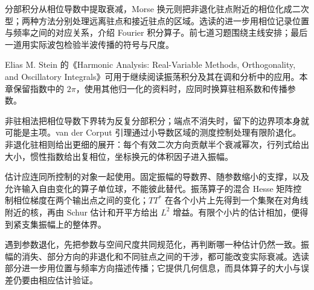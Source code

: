 \ProseParagraphBreak

分部积分从相位导数中提取衰减，Morse 换元则把非退化驻点附近的相位化成二次型；两种方法分别处理远离驻点和接近驻点的区域。选读的进一步用相位记录位置与频率之间的对应关系，介绍 Fourier 积分算子。前七道习题围绕主线安排；最后一道用实际波包检验半波传播的符号与尺度。

\ProseParagraphBreak

Elias M. Stein 的《Harmonic Analysis: Real-Variable Methods, Orthogonality, and Oscillatory Integrals》\cite{Stein1993Harmonic}可用于继续阅读振荡积分及其在调和分析中的应用。本章保留指数中的 \(2\pi\)，使用其他归一化的资料时，应同时换算驻相系数和传播参数。







\begin{chaptersummary}
非驻相法把相位导数下界转为反复分部积分；端点不消失时，留下的边界项本身就可能是主项。van der Corput 引理通过小导数区域的测度控制处理有限阶退化。非退化驻相则给出更细的展开：每个有效二次方向贡献半个衰减幂次，行列式给出大小，惯性指数给出复相位，坐标换元的体积因子进入振幅。

\ProseParagraphBreak

估计应连同所控制的对象一起使用。固定振幅的导数界、随参数缩小的支撑，以及允许输入自由变化的算子单位球，不能彼此替代。振荡算子的混合 Hesse 矩阵控制相位梯度在两个输出点之间的变化；\(TT^*\) 在各个小片上先得到一个集聚在对角线附近的核，再由 Schur 估计和开平方给出 \(L^2\) 增益。有限个小片的估计相加，便得到紧支集振幅上的整体界。

\ProseParagraphBreak

遇到参数退化，先把参数与空间尺度共同规范化，再判断哪一种估计仍然一致。振幅的消失、部分方向的非退化和不同驻点之间的干涉，都可能改变实际衰减。选读部分进一步用位置与频率方向描述传播；它提供几何信息，而具体算子的大小与误差仍要由相应估计验证。
\end{chaptersummary}

\BookExercises

